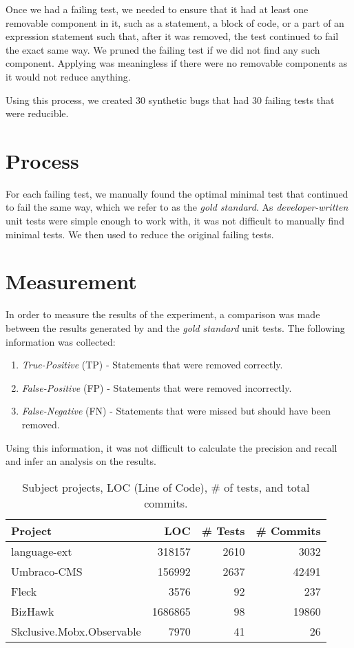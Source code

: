 Once we had a failing test, we needed to ensure that it had at least one removable component in it, such as a statement, a block of code, or a part of an expression statement such that, after it was removed, the test continued to fail the exact same way. We pruned the failing test if we did not find any such component. Applying \mytool was meaningless if there were no removable components as it would not reduce anything.  

Using this process, we created 30 synthetic bugs that had 30 failing tests that were reducible.  

\section{Process}
For each failing test, we manually found the optimal minimal test that continued to fail the same way, which we refer to as the \emph{gold standard}. As \emph{developer-written} unit tests were simple enough to work with, it was not difficult to manually find minimal tests. We then used \mytool to reduce the original failing tests.

\section{Measurement}
In order to measure the results of the experiment, a comparison was made between the results generated by \mytool and the \emph{gold standard} unit tests. The following information was collected:

\begin{enumerate}
    \item \emph{True-Positive} (TP) - Statements that were removed correctly. 
    \item \emph{False-Positive} (FP) - Statements that were removed incorrectly. 
    \item \emph{False-Negative} (FN) - Statements that were missed but should have been removed. 
\end{enumerate}

Using this information, it was not difficult to calculate the precision and recall and infer an analysis on the results.


\begin{table}
\caption{Subject projects, LOC (Line of Code), \# of tests, and total commits. }
\begin{center}
{\scriptsize
\begin{tabular}{|l|r|r|r|}
\hline
Project & LOC & \# Tests & \# Commits \\
\hline
\hline
{language-ext} & 318157 & 2610 & 3032\\
\hline
{Umbraco-CMS} & 156992 & 2637 & 42491\\
\hline
{Fleck} & 3576 & 92 & 237\\
\hline
{BizHawk} & 1686865 & 98 & 19860\\
\hline
{Skclusive.Mobx.Observable} & 7970 & 41 & 26\\
\hline

\end{tabular}
}
\end{center}
\label{tab:avgimproved1}
\end{table}

